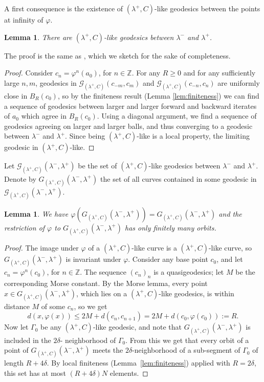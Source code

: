 \documentclass{amsart}
\newcommand{\Z}{\mathbb{Z}}
\newcommand{\G}{\mathcal{G}}
\newtheorem{lemma}[thm]{Lemma}
\theoremstyle{definition}
\begin{document}
A first consequence is the existence of \((\lambda^+,C)\)-like geodesics between the points at infinity of \(\varphi\).

\begin{lemma}\label{lem:between-boundary-points}
There are \((\lambda^+,C)\)-like geodesics between \(\lambda^-\) and \(\lambda^+\).
\end{lemma}

The proof is the same as \cite[Lemma 3.1]{bowditch_tight}, which we sketch for the sake of completeness.

\begin{proof}
Consider \(c_n=\varphi^n(a_0)\), for \(n\in \Z\). For any \(R\geq 0\) and for any sufficiently large \(n,m\), geodesics in \(\G_{(\lambda^+,C)}(c_{-m},c_m)\) and \(\G_{(\lambda^+,C)}(c_{-n},c_n)\) are uniformly close in \(B_R(c_0)\), so by the finiteness result (Lemma \ref{lem:finiteness}) we can find a sequence of geodesics between larger and larger forward and backward iterates of \(a_0\) which agree in \(B_R(c_0)\). Using a diagonal argument, we find a sequence of geodesics agreeing on larger and larger balls, and thus converging to a geodesic between \(\lambda^-\) and \(\lambda^+\). Since being \((\lambda^+,C) \)-like is a local property, the limiting geodesic in \((\lambda^+,C)\)-like.
\end{proof}

Let \(\G_{(\lambda^+,C)}(\lambda^-,\lambda^+)\) be the set of \((\lambda^+,C)\)-like geodesics between \(\lambda^-\) and \(\lambda^+\). Denote by \(G_{(\lambda^+,C)}(\lambda^-,\lambda^+)\) the set of all curves contained in some geodesic in \(\G_{(\lambda^+,C)}(\lambda^-,\lambda^+)\).
\begin{lemma}\label{lem:finite_quotient}
We have \( \varphi(G_{(\lambda^+,C)}(\lambda^-,\lambda^+)) = G_{(\lambda^+,C)}(\lambda^-,\lambda^+) \) and the restriction of \(\varphi\) to \(G_{(\lambda^+,C)}(\lambda^-,\lambda^+)\) has only finitely many orbits.
\end{lemma}

\begin{proof}
The image under $\varphi$ of a \((\lambda^+,C)\)-like curve is a \((\lambda^+,C)\)-like curve, so \(G_{(\lambda^+,C)}(\lambda^-,\lambda^+)\) is invariant under $\varphi$. 
Consider any base point $c_0$, and let \(c_n=\varphi^n(c_0)\), for \(n\in \Z\). The sequence $(c_n)_n$ is a quasigeodesics; let $M$ be the corresponding Morse constant. By the Morse lemma, every point $x \in G_{(\lambda^+,C)}(\lambda^-,\lambda^+)$, which lies on a  \((\lambda^+,C)\)-like geodesics, is within distance $M$ of some $c_n$, so we get
\[
d(x, \varphi(x)) \leq 2M + d(c_n, c_{n+1}) = 2M + d(c_0, \varphi(c_0)) := R.
\]
Now let $\Gamma_0$ be any \((\lambda^+,C)\)-like geodesic, and note that $G_{(\lambda^+,C)}(\lambda^-,\lambda^+)$ is included in the $2\delta$- neighborhood of $\Gamma_0$.
From this we get that every orbit of a point of \(G_{(\lambda^+,C)}(\lambda^-,\lambda^+)\) meets the $2\delta$-neighborhood of a sub-segment of $\Gamma_0$ of length $R + 4\delta$. By local finiteness (Lemma~\ref{lem:finiteness}) applied with $R = 2\delta$, this set has at most $(R + 4\delta)N$ elements.
\end{proof}
\end{document}
